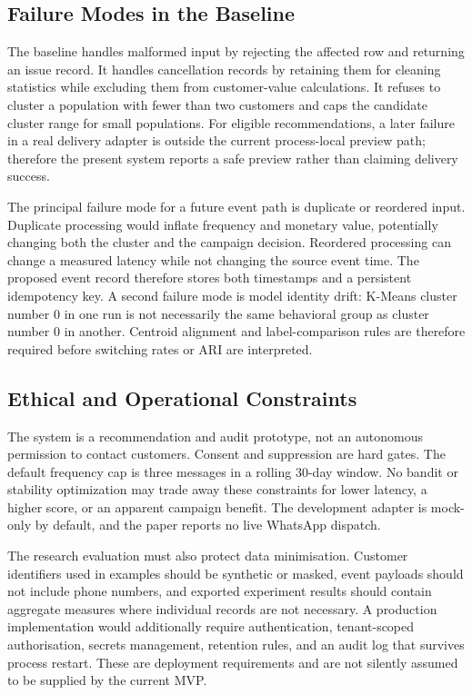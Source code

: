 \documentclass[conference]{IEEEtran}
\begin{document}
\subsection{Failure Modes in the Baseline}
The baseline handles malformed input by rejecting the affected row and returning an issue record. It handles cancellation records by retaining them for cleaning statistics while excluding them from customer-value calculations. It refuses to cluster a population with fewer than two customers and caps the candidate cluster range for small populations. For eligible recommendations, a later failure in a real delivery adapter is outside the current process-local preview path; therefore the present system reports a safe preview rather than claiming delivery success.

The principal failure mode for a future event path is duplicate or reordered input. Duplicate processing would inflate frequency and monetary value, potentially changing both the cluster and the campaign decision. Reordered processing can change a measured latency while not changing the source event time. The proposed event record therefore stores both timestamps and a persistent idempotency key. A second failure mode is model identity drift: K-Means cluster number 0 in one run is not necessarily the same behavioral group as cluster number 0 in another. Centroid alignment and label-comparison rules are therefore required before switching rates or ARI are interpreted.

\subsection{Ethical and Operational Constraints}
The system is a recommendation and audit prototype, not an autonomous permission to contact customers. Consent and suppression are hard gates. The default frequency cap is three messages in a rolling 30-day window. No bandit or stability optimization may trade away these constraints for lower latency, a higher score, or an apparent campaign benefit. The development adapter is mock-only by default, and the paper reports no live WhatsApp dispatch.

The research evaluation must also protect data minimisation. Customer identifiers used in examples should be synthetic or masked, event payloads should not include phone numbers, and exported experiment results should contain aggregate measures where individual records are not necessary. A production implementation would additionally require authentication, tenant-scoped authorisation, secrets management, retention rules, and an audit log that survives process restart. These are deployment requirements and are not silently assumed to be supplied by the current MVP.
\end{document}
